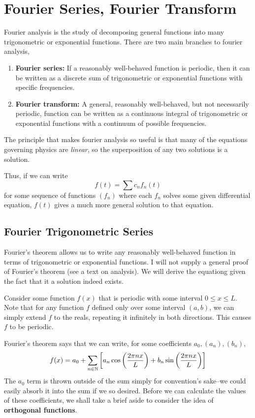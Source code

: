 \chapter{Fourier Series, Fourier Transform}
Fourier analysis is the study of decomposing general functions into many trigonometric or exponential functions. There are two main branches to fourier analysis,
\begin{enumerate}
    \item \textbf{Fourier series:} If a reasonably well-behaved function is periodic, then it can be written as a discrete sum of trigonometric or exponential functions with specific frequencies.
    \item \textbf{Fourier transform:} A general, reasonably well-behaved, but not necessarily periodic, function can be written as a continuous integral of trigonometric or exponential functions with a continuum of possible frequencies.
\end{enumerate}
The principle that makes fourier analysis so useful is that many of the equations governing physics are \textit{linear}, so the superposition of any two solutions is a solution. 

Thus, if we can write
\[ f(t) = \sum c_n f_n(t) \]
for some sequence of functions $(f_n)$ where each $f_n$ solves some given differential equation, $f(t)$ gives a much more general solution to that equation.    
\section{Fourier Trigonometric Series}
Fourier's theorem allows us to write any reasonably well-behaved function in terms of trigonometric or exponential functions. I will not supply a general proof of Fourier's theorem (see a text on analysis). We will derive the equationg given the fact that it a solution indeed exists. 

Consider some function $f(x)$ that is periodic with some interval $0 \le x \le L$. Note that for any function $f$ defined only over some interval $(a,b)$, we can simply extend $f$ to the reals, repeating it infinitely in both directions. This causes $f$ to be periodic.

Fourier's theorem says that we can write, for some coefficients $a_0, (a_n), (b_n)$,
\[ f(x) = a_0 + \sum_{n\in\N} \bqty{a_n\cos\pqty{\frac{2\pi nx}{L}} + b_n\sin\pqty{\frac{2\pi nx}{L}}}\]
The $a_0$ term is thrown outside of the sum simply for convention's sake--we could easily absorb it into the sum if we so desired. Before we can calculate the values of these coefficients, we shall take a brief aside to consider the idea of \textbf{orthogonal functions}.
